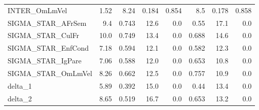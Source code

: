 \begin{tabular}{lrrrrrrr}
INTER\_OmLmVel      &   1.52 &     8.24 &   0.184 &    0.854 &           8.5 &        0.178 &         0.858 \\
SIGMA\_STAR\_AFrSem  &    9.4 &    0.743 &    12.6 &      0.0 &          0.55 &         17.1 &           0.0 \\
SIGMA\_STAR\_CulFr   &   10.0 &    0.749 &    13.4 &      0.0 &         0.688 &         14.6 &           0.0 \\
SIGMA\_STAR\_EnfCond &   7.18 &    0.594 &    12.1 &      0.0 &         0.582 &         12.3 &           0.0 \\
SIGMA\_STAR\_IgPare  &   7.06 &    0.588 &    12.0 &      0.0 &         0.653 &         10.8 &           0.0 \\
SIGMA\_STAR\_OmLmVel &   8.26 &    0.662 &    12.5 &      0.0 &         0.757 &         10.9 &           0.0 \\
delta\_1            &   5.89 &    0.392 &    15.0 &      0.0 &          0.44 &         13.4 &           0.0 \\
delta\_2            &   8.65 &    0.519 &    16.7 &      0.0 &         0.653 &         13.2 &           0.0 \\
\bottomrule
\end{tabular}

